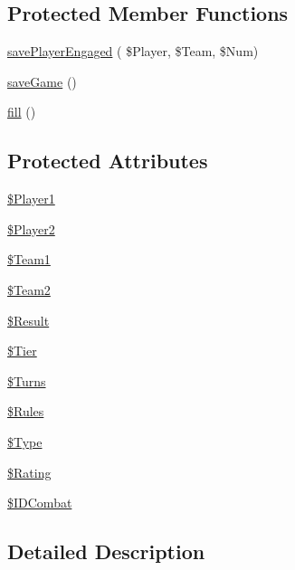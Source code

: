\subsection*{Protected Member Functions}
\begin{DoxyCompactItemize}
\item 
\hyperlink{class_coll_game_a888d595abf397fe39d4d81833e92ad61}{save\+Player\+Engaged} ( \$Player, \$Team, \$Num)
\item 
\hyperlink{class_coll_game_a957e9a00e3ce38129276f8454a242dcd}{save\+Game} ()
\item 
\hyperlink{class_coll_game_aa5284af9c5db56f146e3c07fc0b71a8f}{fill} ()
\end{DoxyCompactItemize}
\subsection*{Protected Attributes}
\begin{DoxyCompactItemize}
\item 
\hyperlink{class_coll_game_aaa913259821f5f77c657e6fcb19c953d}{\$\+Player1}
\item 
\hyperlink{class_coll_game_a063694e7334e555e924d967c6fcf81ed}{\$\+Player2}
\item 
\hyperlink{class_coll_game_adbf6382ca960ee84ab6155e2ebf09499}{\$\+Team1}
\item 
\hyperlink{class_coll_game_a3e81e28243078302774bb1bf059ab63d}{\$\+Team2}
\item 
\hyperlink{class_coll_game_ad80aaf9a4c2c82bcb9ac69e08fb3ca55}{\$\+Result}
\item 
\hyperlink{class_coll_game_a44bb41c8f6fddfe91bf026d076214659}{\$\+Tier}
\item 
\hyperlink{class_coll_game_a48257e88dd49596373dcb4b58e6daea3}{\$\+Turns}
\item 
\hyperlink{class_coll_game_aad6efef7c0ace76934d9bac39569a459}{\$\+Rules}
\item 
\hyperlink{class_coll_game_a9bc709a58330773453ea98b48af3c2a8}{\$\+Type}
\item 
\hyperlink{class_coll_game_a93cd8af13c2930cf452f4866808cb06b}{\$\+Rating}
\item 
\hyperlink{class_coll_game_a75707f35a9b75a77f26d2082baeea2aa}{\$\+I\+D\+Combat}
\end{DoxyCompactItemize}


\subsection{Detailed Description}


